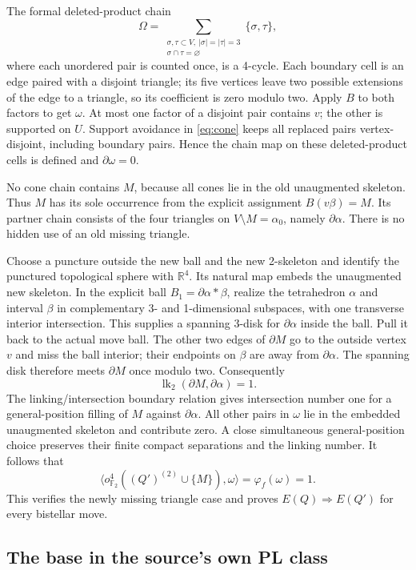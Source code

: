 \documentclass[11pt]{article}
\theoremstyle{remark}
\newcommand{\F}{\mathbb F}
\newcommand{\R}{\mathbb R}
\newcommand{\lk}{\operatorname{lk}}
\newcommand{\vk}{o^4_{\F_2}}
\begin{document}
The formal deleted-product chain
\[
\Omega=\sum_{\substack{\sigma,\tau\subset V,\ |\sigma|=|\tau|=3\\
                         \sigma\cap\tau=\varnothing}}
                    \{\sigma,\tau\},
\]
where each unordered pair is counted once, is a 4-cycle. Each boundary
cell is an edge paired with a disjoint triangle; its five vertices
leave two possible extensions of the edge to a triangle, so its
coefficient is zero modulo two. Apply $B$ to both factors to get
$\omega$. At most one factor of a disjoint pair contains $v$;
the other is supported on $U$. Support avoidance in
\eqref{eq:cone} keeps all replaced pairs vertex-disjoint, including
boundary pairs. Hence the chain map on these deleted-product cells
is defined and $\partial\omega=0$.

No cone chain contains $M$, because all cones lie in the old
unaugmented skeleton. Thus $M$ has its sole occurrence from the
explicit assignment $B(v\beta)=M$. Its partner chain consists of
the four triangles on $V\setminus M=\alpha_0$, namely
$\partial\alpha$. There is no hidden use of an old missing triangle.

Choose a puncture outside the new ball and the new 2-skeleton and
identify the punctured topological sphere with $\R^4$. Its natural
map embeds the unaugmented new skeleton. In the explicit ball
$B_1=\partial\alpha*\beta$, realize the tetrahedron $\alpha$ and
interval $\beta$ in complementary 3- and 1-dimensional subspaces,
with one transverse interior intersection. This supplies a spanning
3-disk for $\partial\alpha$ inside the ball. Pull it back to the
actual move ball. The other two edges of $\partial M$ go to the
outside vertex $v$ and miss the ball interior; their endpoints on
$\beta$ are away from $\partial\alpha$. The spanning disk therefore
meets $\partial M$ once modulo two. Consequently
\[
\lk_2(\partial M,\partial\alpha)=1.
\]
The linking/intersection boundary relation gives intersection number
one for a general-position filling of $M$ against $\partial\alpha$.
All other pairs in $\omega$ lie in the embedded unaugmented skeleton
and contribute zero. A close simultaneous general-position choice
preserves their finite compact separations and the linking number.
It follows that
\[
\langle\vk((Q')^{(2)}\cup\{M\}),\omega\rangle
 =\varphi_f(\omega)=1.
\]
This verifies the newly missing triangle case and proves
$E(Q)\Rightarrow E(Q')$ for every bistellar move.

\subsection{The base in the source's own PL class}
\end{document}
